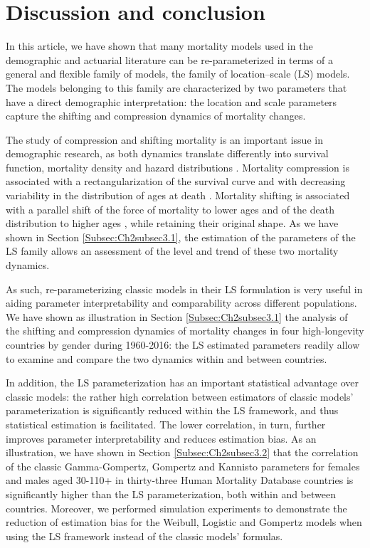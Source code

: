 \documentclass[Thesis]{subfiles}
\begin{document}
\section{Discussion and conclusion}
\label{Sec:Ch2sec4}

In this article, we have shown that many mortality models used in the demographic and actuarial literature can be re-parameterized in terms of a general and flexible family of models, the family of location--scale (LS) models. The models belonging to this family are characterized by two parameters that have a direct demographic interpretation: the location and scale parameters capture the shifting and compression dynamics of mortality changes. 

The study of compression and shifting mortality is an important issue in demographic research, as both dynamics translate differently into survival function, mortality density and hazard distributions \citep{bergeron2015decomposing}. Mortality compression is associated with a rectangularization of the survival curve and with decreasing variability in the distribution of ages at death \citep{wilmoth1999rectangularization,cheung2005three}. Mortality shifting is associated with a parallel shift of the force of mortality to lower ages \citep{bongaarts2005long} and of the death distribution to higher ages \citep{canudas2008modal}, while retaining their original shape. As we have shown in Section \ref{Subsec:Ch2subsec3.1}, the estimation of the parameters of the LS family allows an assessment of the level and trend of these two mortality dynamics.

As such, re-parameterizing classic models in their LS formulation is very useful in aiding parameter interpretability and comparability across different populations. We have shown as illustration in Section \ref{Subsec:Ch2subsec3.1} the analysis of the shifting and compression dynamics of mortality changes in four high-longevity countries by gender during 1960-2016: the LS estimated parameters readily allow to examine and compare the two dynamics within and between countries.

In addition, the LS parameterization has an important statistical advantage over classic models: the rather high correlation between estimators of classic models' parameterization is significantly reduced within the LS framework, and thus statistical estimation is facilitated. The lower correlation, in turn, further improves parameter interpretability and reduces estimation bias. As an illustration, we have shown in Section \ref{Subsec:Ch2subsec3.2} that the correlation of the classic Gamma-Gompertz, Gompertz and Kannisto parameters for females and males aged 30-110+ in thirty-three Human Mortality Database countries is significantly higher than the LS parameterization, both within and between countries. Moreover, we performed simulation experiments to demonstrate the reduction of estimation bias for the Weibull, Logistic and Gompertz models when using the LS framework instead of the classic models' formulas.
\end{document}
